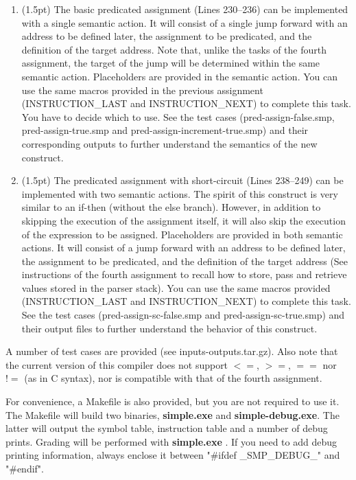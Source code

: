 \documentclass[letter,10pt]{article}
\begin{document}
\begin{enumerate}


\item (1.5pt)
The basic predicated assignment (Lines 230--236) can be implemented with a
single semantic action.  It will consist of a single jump forward with an
address to be defined later, the assignment to be predicated, and the
definition of the target address. Note that, unlike the tasks of the fourth
assignment, the target of the jump will be determined within the same semantic
action.  Placeholders are provided in the semantic action.  You can use the
same macros provided in the previous assignment (INSTRUCTION\_LAST and
INSTRUCTION\_NEXT) to complete this task.  You have to decide which to use. See
the test cases (pred-assign-false.smp, pred-assign-true.smp and
pred-assign-increment-true.smp) and their corresponding outputs to further
understand the semantics of the new construct.

\item (1.5pt)
The predicated assignment with short-circuit (Lines 238--249) can be
implemented with two semantic actions.  The spirit of this construct is very
similar to an if-then (without the else branch). However, in addition to
skipping the execution of the assignment itself, it will also skip the
execution of the expression to be assigned.  
Placeholders are provided in both semantic actions.  
It will consist of a jump
forward with an address to be defined later, the assignment to be predicated,
and the definition of the target address (See instructions of the fourth
assignment to recall how to store, pass and retrieve values stored in the
parser stack).  You can use the same macros provided (INSTRUCTION\_LAST and
INSTRUCTION\_NEXT) to complete this task.  See the test cases
(pred-assign-sc-false.smp and  pred-assign-sc-true.smp) and their output
files to further understand the behavior of this construct.


\end{enumerate}

A number of test cases are provided (see inputs-outputs.tar.gz). 
Also note that the current version of this compiler does not support $<=$, $>=$, $==$ nor $!=$ (as in C syntax),
nor is compatible with that of the fourth assignment.

For convenience, a Makefile is also provided, but you are not required to use it.
The Makefile will build two binaries, {\bf simple.exe} and {\bf simple-debug.exe}. The latter will output
the symbol table, instruction table and a number of debug prints. Grading will be performed with
{\bf simple.exe} . If you need to add debug printing information, always enclose it between "\#ifdef \_SMP\_DEBUG\_" and "\#endif".
\end{document}
